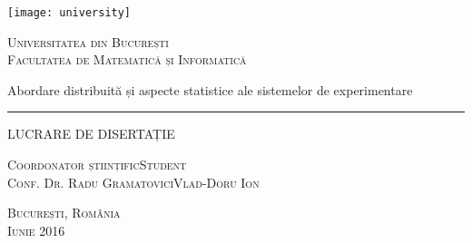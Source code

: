 \begin{titlepage}
	\begin{center}

		\texttt{[image: university]}

		\vspace{0.5cm}
		\LARGE \textsc{Universitatea din București}
		\\
		\vspace{0.5cm}
		\Large \textsc{Facultatea de Matematică și Informatică}

		\vfill

		\Huge Abordare distribuită și aspecte statistice ale sistemelor de experimentare
		\rule{\textwidth}{1pt}
		\Large LUCRARE DE DISERTAȚIE

		\vfill

		\Large
		\textsc{Coordonator științific}\hfill \textsc{Student}
		\\
		\large
		\textsc{Conf. Dr. Radu Gramatovici}\hfill \textsc{Vlad-Doru Ion}
	
		\vspace{1.5cm}
		\textsc{București, România}\\
		\textsc{Iunie 2016}

	\end{center}
\end{titlepage}
 
